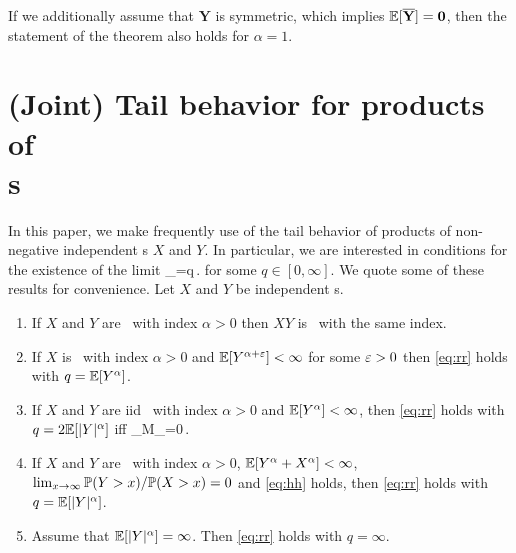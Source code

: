 \begin{remark}\label{rem:case:alpha:1}
If we additionally assume that $\mathbf{Y}$ is symmetric, which implies ${\mathbb E}[\overline {{\mathbf Y}}]=\mathbf{0}$, then the statement 
of the theorem also holds for $\alpha=1$.
\end{remark}

\section{(Joint) Tail behavior for products of \regvary\ \\ \rv s}\label{App:B}
In this paper, we make frequently use of the tail behavior of products of non-negative independent \rv s $X$ and $Y$.
In particular, we are interested in conditions for the existence of the limit
\beam\label{eq:rr}
\lim_{\xto}=q\,.
\eeam 
for some $q\in [0,\infty]$.
We quote some of these results
for convenience.
\ble\label{lem:product} Let $X$ and $Y$ be independent \rv s.
\begin{enumerate}
\item 
If $X$ and $Y$ are \regvary\ with index $\alpha>0$ then $XY$ is \regvary\ with the same index.
\item
If $X$ is \regvary\ with index $\alpha>0$ and ${\mathbb E}[Y^{\alpha+\varepsilon}]<\infty$ for some $\varepsilon>0$ then \eqref{eq:rr} holds with 
$q={\mathbb E}[Y^\alpha]$.
\item
If  $X$ and $Y$ are iid \regvary\ with index $\alpha>0$ and ${\mathbb E}[Y^\alpha]<\infty$, then \eqref{eq:rr} holds with
$q=2 {\mathbb E}[|Y|^\alpha]$ iff
\beam\label{eq:hh}
\lim_{M\to\infty}\limsup_{\xto}=0\,.
\eeam
\item
If $X$ and $Y$ are \regvary\ with index $\alpha>0$, ${\mathbb E}[Y^\alpha+ X^\alpha]<\infty$, $\lim_{x\to\infty} {\mathbb P}(Y>x)/{\mathbb P}(X>x)=0$ and 
\eqref{eq:hh} holds, then \eqref{eq:rr} holds with $q={\mathbb E}[|Y|^\alpha]$.
\item
Assume that ${\mathbb E}[|Y|^\alpha]=\infty$. Then  \eqref{eq:rr} holds with $q=\infty$.
\end{enumerate}
\ele
